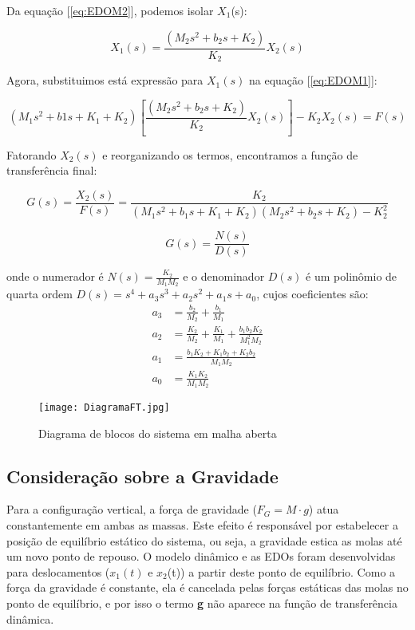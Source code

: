 \documentclass[9pt,a4paper,twocolumn,twoside]{tau-class/tau}
\begin{document}
Da equação [\ref{eq:EDOM2}], podemos isolar $X_1$(s):

\begin{equation}
    X_1(s) = \frac{(M_2s^2 + b_2s + K_2)}{K_2}X_2(s)
    \label{eq:X1iso}
\end{equation}

Agora, substituimos está expressão para $X_1(s)$ na equação [\ref{eq:EDOM1}]:

\begin{equation}
    (M_1s^2 + b1s + K_1 + K_2)\left[\frac{(M_2s^2 + b_2s + K_2)}{K_2}X_2(s)\right] - K_2X_2(s) = F(s)
    \label{eq:substX1}
\end{equation}

Fatorando $X_2(s)$ e reorganizando os termos, encontramos a função de transferência final:

\begin{equation}
    G(s) = \frac{X_2 (s)}{F(s)} = \frac{K_2}{(M_1 s^2 + b_1 s + K_1 + K_2)(M_2 s^2 + b_2 s + K_2) - K_2 ^2}
\label{eq: FT}
\end{equation}

\begin{equation}
    G(s) = \frac{N(s)}{D(s)}
    \label{eq: FTresum}
\end{equation}

onde o numerador é $N(s) = \frac{K_2}{M_1M_2}$ e o denominador $D(s)$ é um polinômio de quarta ordem $D(s) = s^4 + a_3s^3 + a_2s^2 + a_1s + a_0$, cujos coeficientes são:
\begin{align}
    a_3 &= \frac{b_2}{M_2} + \frac{b_1}{M_1} \\
    a_2 &= \frac{K_2}{M_2} + \frac{K_1}{M_1} + \frac{b_1b_2K_2}{M_1^2M_2} \\
    a_1 &= \frac{b_1K_2 + K_1b_2 + K_2b_2}{M_1M_2} \\
    a_0 &= \frac{K_1K_2}{M_1M_2}
\end{align}

\begin{figure}[H]
    \centering
    \texttt{[image: DiagramaFT.jpg]}
    \caption{Diagrama de blocos do sistema em malha aberta}
    \label{DiagramaFT}
\end{figure}

\subsection{Consideração sobre a Gravidade}

Para a configuração vertical, a força de gravidade ($F_G = M \cdot g$) atua constantemente em ambas as massas. Este efeito é responsável por estabelecer a posição de equilíbrio estático do sistema, ou seja, a gravidade estica as molas até um novo ponto de repouso. O modelo dinâmico e as EDOs foram desenvolvidas para deslocamentos ($x_1(t)$ e $x_2$(t)) a partir deste ponto de equilíbrio. Como a força da gravidade é constante, ela é cancelada pelas forças estáticas das molas no ponto de equilíbrio, e por isso o termo \textbf{g} não aparece na função de transferência dinâmica.
\end{document}
